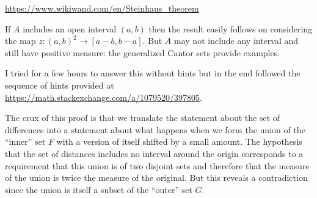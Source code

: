 \url{https://www.wikiwand.com/en/Steinhaus_theorem}

\begin{remark*}
  If $A$ includes an open interval $(a, b)$ then the result easily follows on considering the
  map $z:(a, b)^2\to [a-b, b-a]$. But $A$ may not include any interval and still have positive measure: the
  generalized Cantor sets provide examples.
\end{remark*}

\begin{remark*}
  I tried for a few hours to answer this without hints but in the end followed the sequence of hints provided
  at \url{https://math.stackexchange.com/a/1079520/397805}.
\end{remark*}


\begin{intuition*}
  The crux of this proof is that we translate the statement about the set of differences into a statement about
  what happens when we form the union of the ``inner​'' set $F$ with a version of itself shifted by a small
  amount. The hypothesis that the set of distances includes no interval around the origin corresponds to a
  requirement that this union is of two disjoint sets and therefore that the measure of the union is twice the
  measure of the original. But this reveals a contradiction since the union is itself a subset of the ``outer​''
  set $G$.
\end{intuition*}


